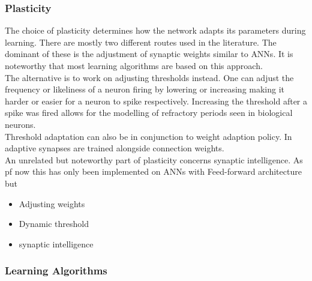 \subsubsection{Plasticity}
	The choice of plasticity determines how the network adapts its parameters during learning. There are mostly two different routes used in the literature. The dominant of these is the adjustment of synaptic weights similar to \acp{ANN}. It is noteworthy that most learning algorithms are based on this approach.\\
	The alternative is to work on adjusting thresholds instead\cite{chen_adaptive_2022,amin_automated_2021}. One can adjust the frequency or likeliness of a neuron firing by lowering or increasing making it harder or easier for a neuron to spike respectively. Increasing the threshold after a spike was fired allows for the modelling of refractory periods seen in biological neurons.\\
	Threshold adaptation can also be in conjunction to weight adaption policy. In \cite{sun_synapse-threshold_2023} adaptive synapses are trained alongside connection weights.\\
	An unrelated but noteworthy part of plasticity concerns synaptic intelligence\cite{bibid}. As pf now this has only been implemented on \acp{ANN} with Feed-forward architecture but

\begin{itemize}
	\item Adjusting weights
	\item Dynamic threshold
	\item synaptic intelligence
\end{itemize}
\subsubsection{Learning Algorithms}

